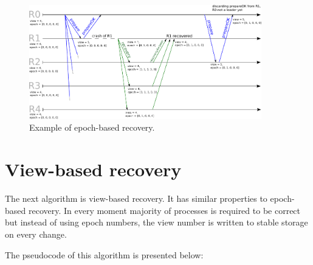 \begin{figure}[h]
 \centering
 \includegraphics[keepaspectratio, width=0.9\textwidth]{recovery/epoch_recovery.pdf}
 \caption{Example of epoch-based recovery.}
 \label{fig:epoch_based_recovery}
\end{figure}

\section{View-based recovery}
\label{sec:view_ss}

The next algorithm is view-based recovery. It has similar properties to epoch-based recovery. In every moment majority of processes is required to be correct but instead of using epoch numbers, the view number is written to stable storage on every change. 

The pseudocode of this algorithm is presented below: 

